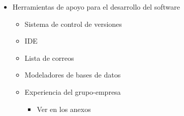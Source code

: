 \documentclass[12pt]{article}
\begin{document}
\begin{itemize}
\item Herramientas de apoyo para el desarrollo del software
\begin{itemize}
\item Sistema de control de versiones
\item IDE 
\item Lista de correos 
\item Modeladores de bases de datos
\end{itemize} 

\begin{itemize}
\item Experiencia del grupo-empresa
\begin{itemize}
\item Ver en los anexos
\end{itemize} 
\end{itemize}

\end{itemize}




\thispagestyle{empty}
\end{document}
